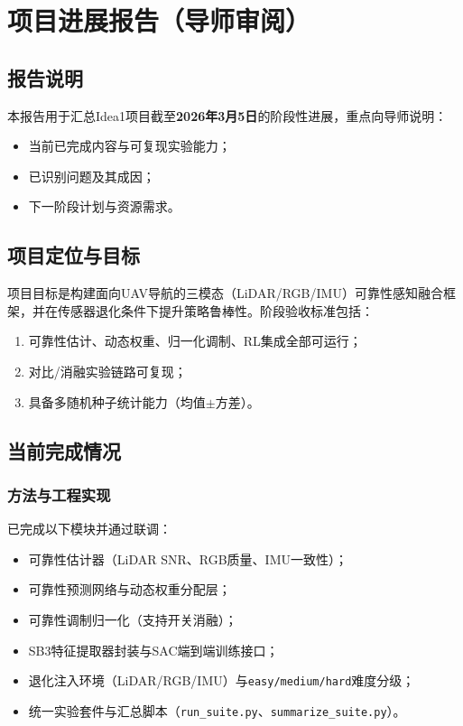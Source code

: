 \chapter{项目进展报告（导师审阅）}
\label{appendix-progress-report}

\section{报告说明}
本报告用于汇总Idea1项目截至\textbf{2026年3月5日}的阶段性进展，重点向导师说明：
\begin{itemize}
    \item 当前已完成内容与可复现实验能力；
    \item 已识别问题及其成因；
    \item 下一阶段计划与资源需求。
\end{itemize}

\section{项目定位与目标}
项目目标是构建面向UAV导航的三模态（LiDAR/RGB/IMU）可靠性感知融合框架，并在传感器退化条件下提升策略鲁棒性。阶段验收标准包括：
\begin{enumerate}
    \item 可靠性估计、动态权重、归一化调制、RL集成全部可运行；
    \item 对比/消融实验链路可复现；
    \item 具备多随机种子统计能力（均值$\pm$方差）。
\end{enumerate}

\section{当前完成情况}
\subsection{方法与工程实现}
已完成以下模块并通过联调：
\begin{itemize}
    \item 可靠性估计器（LiDAR SNR、RGB质量、IMU一致性）；
    \item 可靠性预测网络与动态权重分配层；
    \item 可靠性调制归一化（支持开关消融）；
    \item SB3特征提取器封装与SAC端到端训练接口；
    \item 退化注入环境（LiDAR/RGB/IMU）与\texttt{easy/medium/hard}难度分级；
    \item 统一实验套件与汇总脚本（\texttt{run\_suite.py}、\texttt{summarize\_suite.py}）。
\end{itemize}

